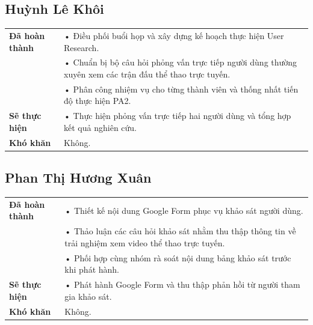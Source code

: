 \documentclass[11pt,a4paper]{article}
\begin{document}
\vspace{0.6cm}


\subsection*{Huỳnh Lê Khôi}

\begin{tabularx}{\textwidth}{|p{4cm}|X|}
\hline
\textbf{Đã hoàn thành} &
• Điều phối buổi họp và xây dựng kế hoạch thực hiện User Research.\\
&
• Chuẩn bị bộ câu hỏi phỏng vấn trực tiếp người dùng thường xuyên xem các trận đấu thể thao trực tuyến.\\
&
• Phân công nhiệm vụ cho từng thành viên và thống nhất tiến độ thực hiện PA2.\\
\hline

\textbf{Sẽ thực hiện} &
• Thực hiện phỏng vấn trực tiếp hai người dùng và tổng hợp kết quả nghiên cứu.\\
\hline

\textbf{Khó khăn} &
Không.\\
\hline
\end{tabularx}

\vspace{0.6cm}


\subsection*{Phan Thị Hương Xuân}

\begin{tabularx}{\textwidth}{|p{4cm}|X|}
\hline
\textbf{Đã hoàn thành} &
• Thiết kế nội dung Google Form phục vụ khảo sát người dùng.\\
&
• Thảo luận các câu hỏi khảo sát nhằm thu thập thông tin về trải nghiệm xem video thể thao trực tuyến.\\
&
• Phối hợp cùng nhóm rà soát nội dung bảng khảo sát trước khi phát hành.\\
\hline

\textbf{Sẽ thực hiện} &
• Phát hành Google Form và thu thập phản hồi từ người tham gia khảo sát.\\
\hline

\textbf{Khó khăn} &
Không.\\
\hline
\end{tabularx}
\end{document}
